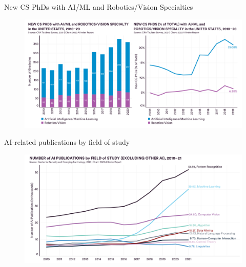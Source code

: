 {

\begin{frame}{New CS PhDs with AI/ML and Robotics/Vision Specialties}

\begin{figure}
 \centering
 \includegraphics[width=1.0\textwidth]{./figures/progress-of-air-a1/outputs/drawing-v00.png}
\end{figure}

\end{frame}
}



{

\begin{frame}{
AI-related publications by field of study
}

\begin{figure}
 \centering
 \includegraphics[width=1.0\textwidth]{./figures/progress-of-air-b/outputs/drawing-v01.png}
\end{figure}

\end{frame}
}


